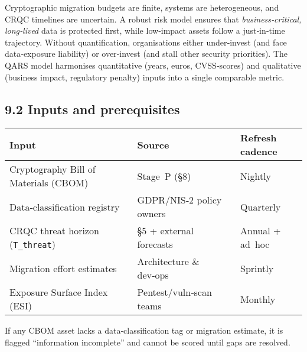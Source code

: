 \documentclass[
  english,
]{article}
\begin{document}
Cryptographic migration budgets are finite, systems are heterogeneous,
and CRQC timelines are uncertain. A robust risk model ensures that
\emph{business‑critical, long‑lived} data is protected first, while
low‑impact assets follow a just‑in‑time trajectory. Without
quantification, organisations either under‑invest (and face
data‑exposure liability) or over‑invest (and stall other security
priorities). The QARS model harmonises quantitative (years, euros,
CVSS‑scores) and qualitative (business impact, regulatory penalty)
inputs into a single comparable metric.

\subsection{9.2 Inputs and
prerequisites}\label{inputs-and-prerequisites}

\begin{longtable}[]{@{}
  >{\raggedright\arraybackslash}p{}
  >{\raggedright\arraybackslash}p{}
  >{\raggedright\arraybackslash}p{}@{}}
\toprule\noalign{}
\begin{minipage}[b]{\linewidth}\raggedright
Input
\end{minipage} & \begin{minipage}[b]{\linewidth}\raggedright
Source
\end{minipage} & \begin{minipage}[b]{\linewidth}\raggedright
Refresh cadence
\end{minipage} \\
\midrule\noalign{}
\endhead
\bottomrule\noalign{}
\endlastfoot
Cryptography Bill of Materials (CBOM) & Stage~P (§8) & Nightly \\
Data‑classification registry & GDPR/NIS‑2 policy owners & Quarterly \\
CRQC threat horizon (\texttt{T\_threat}) & §5 + external forecasts &
Annual + ad~hoc \\
Migration effort estimates & Architecture \& dev‑ops & Sprintly \\
Exposure Surface Index (ESI) & Pentest/vuln‑scan teams & Monthly \\
\end{longtable}

If any CBOM asset lacks a data‑classification tag or migration estimate,
it is flagged ``information incomplete'' and cannot be scored until gaps
are resolved.
\end{document}
